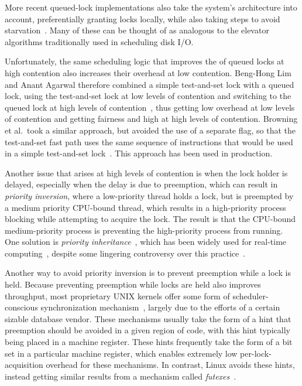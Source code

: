 More recent queued-lock implementations also take the system's architecture
into account, preferentially granting locks locally, while also taking
steps to avoid
starvation~\cite{McKenney02e,radovic03hierarchical,radovic02efficient,BenJackson02,McKenney02d}.
Many of these can be thought of as analogous to the elevator algorithms
traditionally used in scheduling disk I/O.

Unfortunately, the same scheduling logic that improves the 
of queued locks at high contention also increases their overhead at
low contention.
Beng-Hong Lim and Anant Agarwal therefore combined a simple test-and-set
lock with a queued lock, using the test-and-set lock at low levels of
contention and switching to the queued lock at high levels of
contention~\cite{BengHongLim94}, thus getting low overhead at low levels
of contention and getting fairness and high  at high levels
of contention.
Browning et al.\ took a similar approach, but avoided the use of a separate
flag, so that the test-and-set fast path uses the same sequence of
instructions that would be used in a simple test-and-set
lock~\cite{LukeBrowning2005SimpleLockNUMAAware}.
This approach has been used in production.

Another issue that arises at high levels of contention is when the
lock holder is delayed, especially when the delay is due to
preemption, which can result in \emph{priority inversion},
where a low-priority thread holds a lock, but is preempted
by a medium priority CPU-bound thread, which results in
a high-priority process blocking while attempting to acquire the
lock.
The result is that the CPU-bound medium-priority process is preventing the
high-priority process from running.
One solution is \emph{priority inheritance}~\cite{Lampson1980Mesa},
which has been widely used for real-time
computing~\cite{LuiSha1990PriorityInheritance,JonathanCorbet2006PriorityInheritance},
despite some lingering controversy over this
practice~\cite{Yodaiken2004FSM,DougLocke2002a}.

Another way to avoid priority inversion is to prevent preemption
while a lock is held.
Because preventing preemption while locks are held also improves throughput,
most proprietary UNIX kernels offer some form of scheduler-conscious
synchronization mechanism~\cite{Kontothanassis97a},
largely due to the efforts of a certain sizable database vendor.
These mechanisms usually take the form of a hint that preemption
should be avoided in a given region of code, with this hint typically
being placed in a machine register.
These hints frequently take the form of a bit set in a particular
machine register, which enables extremely low per-lock-acquisition overhead
for these mechanisms.
In contrast, Linux avoids these hints, instead getting
similar results from a mechanism called
\emph{futexes}~\cite{HubertusFrancke2002Futex,IngoMolnar2006RobustFutexes,StevenRostedt2006piFutexes,UlrichDrepper2011Futexes}.

